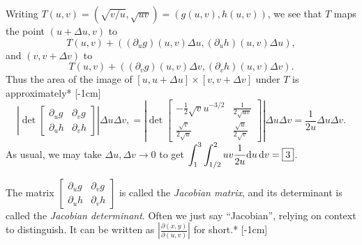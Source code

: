 \documentclass[svgnames]{watsonbook}
\begin{document}
\begin{solution}
  Writing $T(u,v) =
  (\sqrt{v/u}, \sqrt{uv}) = (g(u,v), h(u,v))$, we see that $T$ maps
  the point $(u+\Delta u, v)$ to
  \begin{equation} \label{eq:Tv}
    T(u,v) + ((\partial_u g)(u,v) \Delta u,
    (\partial_u h)(u,v) \Delta u), 
  \end{equation}
  and
  $(v, v+\Delta v)$ to
  \begin{equation} \label{eq:Tu}
    T(u,v) + ((\partial_v g)(u,v) \Delta v,
    (\partial_v h)(u,v) \Delta v). 
  \end{equation}
  Thus the area of the image of $[u, u+\Delta u] \times [v, v + \Delta
  v]$ under $T$ is approximately* [-1cm]
  \[
    \left| \det \left[
      \begin{array}{cc}
        \partial_u g & \partial _v g \\
        \partial_u h & \partial _v h
      \end{array} \right]
    \right| \Delta u \Delta v,  =
    \left| \det \left[
      \begin{array}{cc}
        -\frac{1}{2}\sqrt{v}u^{-3/2} & \frac{1}{2\sqrt{uv}} \\
        \frac{\sqrt{v}}{2\sqrt{u}} & \frac{\sqrt{u}}{2\sqrt{v}}
      \end{array} \right]
      \right| \Delta u \Delta v  = \frac{1}{2u}
      \Delta u \Delta v. 
    \]
    As usual, we may take $\Delta u, \Delta v \to 0$ to get 
    $\displaystyle{\int_{1}^{3}\int_{1/2}^{2}uv \frac{1}{2u}  
    \mathrm{d}u \, {\mathrm{d}}v = \boxed{3}}$. 
  \end{solution}

  The matrix $\left[
      \begin{array}{cc}
        \partial_u g & \partial _v g \\
        \partial_u h & \partial _v h
      \end{array} \right]$ is called the \textit{Jacobian matrix}, and
    its determinant is called the \textit{Jacobian determinant}. Often we just say
    ``Jacobian'', relying on context to distinguish. It can be written
    as $\left|\frac{\partial (x,y)}{\partial (u,v)} \right|$ for
    short.* [-1cm]
    
\end{document}
